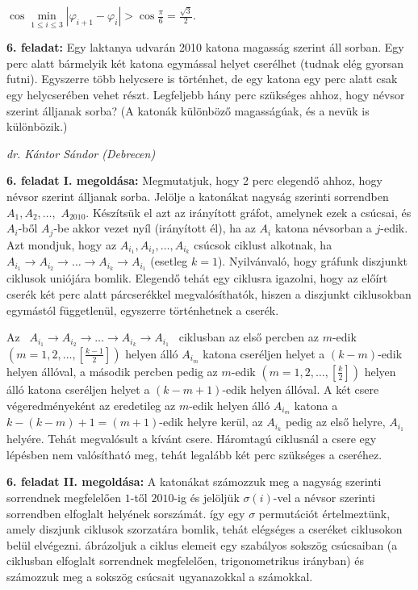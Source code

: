 \documentclass[a4paper,10pt]{article}
\def\ki#1#2{\hfill {\it #1 (#2)}\medskip}
\begin{document}
\centerline{$\cos \min \limits_{1\leq i\leq
3}|\varphi_{i+1}-\varphi_i|>\cos \frac{\pi}{6}=\frac{\sqrt{3}}{2}.$}

\medskip

{\bf 6. feladat: } Egy laktanya udvarán 2010 katona magasság szerint
  áll sorban. Egy perc alatt bármelyik két katona egymással helyet
  cserélhet (tudnak elég gyorsan futni). Egyszerre több helycsere
  is történhet, de egy katona egy perc alatt csak egy helycserében
  vehet részt. Legfeljebb hány perc szükséges ahhoz, hogy névsor
  szerint álljanak sorba? (A katonák különböző magasságúak, és a
  nevük is különbözik.)

\ki{dr. Kántor Sándor}{Debrecen}\medskip

\textbf{6. feladat I. megoldása: } Megmutatjuk, hogy 2 perc elegendő ahhoz, hogy névsor szerint álljanak sorba.
Jelölje a katonákat nagyság sze\-rinti sorrendben $A_1, A_2, \ldots
,$ $A_{2010}.$ Készítsük el azt az irányított gráfot, amelynek ezek
a csúcsai, és $A_i$-ből $A_j$-be akkor vezet nyíl (irányított él),
ha az $A_i$ katona névsorban a $j$-edik. Azt mondjuk, hogy az
$A_{i_1}, A_{i_2}, \dots , A_{i_k}$ csúcsok ciklust alkotnak, ha
$A_{i_1}\rightarrow A_{i_2}\rightarrow \dots \rightarrow
A_{i_k}\rightarrow A_{i_1}$ (esetleg $k=1$). Nyilvánvaló, hogy
gráfunk diszjunkt ciklusok uniójára bomlik. Elegendő tehát egy
ciklusra igazolni, hogy az előírt cserék két perc alatt párcserékkel
megvalósíthatók, hiszen a diszjunkt ciklusokban egymástól
függet\-lenül, egy\-szerre történhetnek a cserék.

Az \ $A_{i_1}\rightarrow A_{i_2}\rightarrow \dots \rightarrow
A_{i_k}\rightarrow A_{i_1}$ \ ciklusban az első percben az $m$-edik
$\left (m = 1, 2, \dots , [\frac{k-1}{2}]\right )$ helyen álló
$A_{i_m}$ katona cseréljen helyet a $(k-m)$-edik helyen állóval, a
második percben pedig az $m$-edik $\left (m = 1, 2, \dots ,
[\frac{k}{2}]\right )$ helyen álló katona cseréljen helyet a
$(k-m+1)$-edik helyen állóval. A két csere végeredményeként az
eredetileg az $m$-edik helyen álló $A_{i_m}$ katona a
$k-(k-m)+1=(m+1)$-edik helyre kerül, az $A_{i_k}$ pedig az első
helyre, $A_{i_1}$ helyére. Tehát megvalósult a kívánt csere.
Háromtagú ciklusnál a csere egy lépésben nem valósítható meg, tehát
legalább két perc szükséges a cseréhez.

\medskip


\textbf{6. feladat II. megoldása: } A katonákat számozzuk meg a
nagyság sze\-rinti sorrendnek megfelelően $1$-től $2010$-ig
és jelöljük $\sigma(i)$-vel a névsor szerinti sorrendben
elfoglalt helyének sorszámát. így egy $\sigma$
permutációt értelmeztünk, amely diszjunk ciklusok
szorzatára bomlik, tehát elégséges a cseréket ciklusokon
belül elvégezni. ábrázoljuk a ciklus elemeit egy szabályos
sokszög csúcsaiban (a ciklusban elfoglalt sorrendnek megfelel\H
oen, trigonometrikus irányban) és számozzuk meg a sokszög
csúcsait ugyanazokkal a számokkal.
\end{document}
